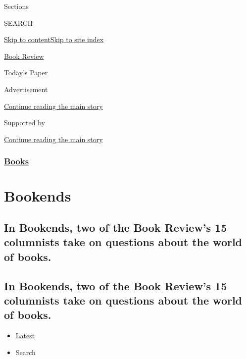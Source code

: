 Sections

SEARCH

\protect\hyperlink{site-content}{Skip to
content}\protect\hyperlink{site-index}{Skip to site index}

\href{https://www.nytimes.com/section/books/review}{Book Review}

\href{https://myaccount.nytimes.com/auth/login?response_type=cookie\&client_id=vi}{}

\href{https://www.nytimes.com/section/todayspaper}{Today's Paper}

Advertisement

\protect\hyperlink{after-top}{Continue reading the main story}

Supported by

\protect\hyperlink{after-sponsor}{Continue reading the main story}

\hypertarget{books}{%
\subsubsection{\texorpdfstring{\href{/section/books}{Books}}{Books}}\label{books}}

\hypertarget{bookends}{%
\section{Bookends}\label{bookends}}

\hypertarget{in-bookends-two-of-the-book-reviews-15-columnists-take-on-questions-about-the-world-of-books}{%
\subsection{In Bookends, two of the Book Review's 15 columnists take on
questions about the world of
books.}\label{in-bookends-two-of-the-book-reviews-15-columnists-take-on-questions-about-the-world-of-books}}

\hypertarget{in-bookends-two-of-the-book-reviews-15-columnists-take-on-questions-about-the-world-of-books-1}{%
\subsection{In Bookends, two of the Book Review's 15 columnists take on
questions about the world of
books.}\label{in-bookends-two-of-the-book-reviews-15-columnists-take-on-questions-about-the-world-of-books-1}}

\begin{itemize}
\tightlist
\item
  \protect\hyperlink{stream-panel}{Latest}
\item
  Search
\end{itemize}

